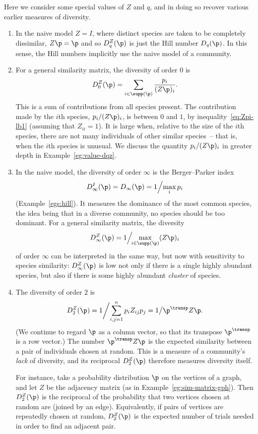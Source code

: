 \begin{examples}
Here we consider some special values of $Z$ and $q$, and in doing so
recover various earlier measures of diversity.

\begin{enumerate}
\item 
{}
In the naive model $Z = I$, where distinct species are taken to be
completely dissimilar, $Z\p = \p$ and so $D_q^Z(\p)$ is just the Hill
number $D_q(\p)$.  In this sense, the Hill numbers implicitly use the
naive model of a community.

\item
For a general similarity matrix, the diversity of order $0$ is 
\[
D_0^Z(\p) = \sum_{i \in \supp(\p)} \frac{p_i}{(Z\p)_i}.
\]
This is a sum of contributions from all species present.  The contribution
made by the $i$th species, $p_i/(Z\p)_i$, is between $0$ and $1$, by
inequality~\eqref{eq:Zpi-lb1} (assuming that $Z_{ii} = 1$). It is large
when, relative to the size of the $i$th species, there are not many
individuals of other similar species~-- that is, when the $i$th species is
unusual.  We discuss the quantity $p_i/(Z\p)_i$ in greater depth in
Example~\ref{eg:value-dqz}.

\item
In the naive model, the diversity of order $\infty$ is the Berger--Parker%
% 
% 
index
\[
D_\infty^I(\p) = D_\infty(\p) = 1\Big/\!\max_i p_i
\]
(Example~\ref{egs:hill}).  It measures the dominance of
the most common species, the idea being that in a diverse community, no
species should be too dominant.  For a general similarity matrix, the
diversity
\[
D_\infty^Z(\p) = 1\Big/\!\!\max_{i \in \supp(\p)} (Z\p)_i
\]
of order $\infty$ can be interpreted in the same way, but now with
sensitivity to species similarity: $D_\infty^Z(\p)$ is low not only if
there is a single highly abundant species, but also if there is some highly
abundant \emph{cluster} of species.

\item
{}
The diversity of order $2$ is
\[
D_2^Z(\p) 
=
1\bigg/\!\sum_{i, j = 1}^n p_i Z_{ij} p_j
=
1\big/\p^\transp Z \p.
\]
(We continue to regard $\p$ as a column vector, so that its transpose
$\p^\transp$ is a row vector.)  The number $\p^\transp Z \p$ is the
expected similarity between a pair of individuals chosen at random.  This
is a measure of a community's \emph{lack} of diversity, and its reciprocal
$D_2^Z(\p)$ therefore measures diversity itself.

For instance, take a probability distribution $\p$ on the vertices of a
graph,%
%
% 
and let $Z$ be the adjacency matrix (as in
Example~\ref{eg:sim-matrix-gph}).  Then $D_2^Z(\p)$ is the
reciprocal of the probability that two vertices chosen at random are
 (joined by an edge).  Equivalently, if pairs of vertices
are repeatedly chosen at random, $D_2^Z(\p)$ is the expected number of
trials needed in order to find an adjacent pair.
\end{enumerate}
\end{examples}

